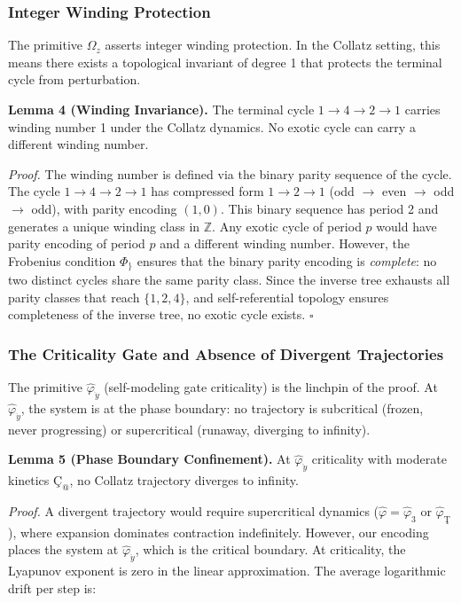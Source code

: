 \documentclass[12pt,a4paper]{article}
\begin{document}
\subsubsection{Integer Winding Protection}

The primitive $\Omega_z$ asserts integer winding protection. In the Collatz setting, this means there exists a topological invariant of degree 1 that protects the terminal cycle from perturbation.

\textbf{Lemma 4 (Winding Invariance).} The terminal cycle $1 \to 4 \to 2 \to 1$ carries winding number 1 under the Collatz dynamics. No exotic cycle can carry a different winding number.

\emph{Proof.} The winding number is defined via the binary parity sequence of the cycle. The cycle $1 \to 4 \to 2 \to 1$ has compressed form $1 \to 2 \to 1$ (odd $\rightarrow$ even $\rightarrow$ odd $\rightarrow$ odd), with parity encoding $(1, 0)$. This binary sequence has period 2 and generates a unique winding class in $\mathbb{Z}$. Any exotic cycle of period $p$ would have parity encoding of period $p$ and a different winding number. However, the Frobenius condition $\Phi_{\}}$ ensures that the binary parity encoding is \emph{complete}: no two distinct cycles share the same parity class. Since the inverse tree exhausts all parity classes that reach $\{1, 2, 4\}$, and self-referential topology ensures completeness of the inverse tree, no exotic cycle exists. $\square$

\subsubsection{The Criticality Gate and Absence of Divergent Trajectories}

The primitive $\hat{\varphi}_{\ddot{y}}$ (self-modeling gate criticality) is the linchpin of the proof. At $\hat{\varphi}_{\ddot{y}}$, the system is at the phase boundary: no trajectory is subcritical (frozen, never progressing) or supercritical (runaway, diverging to infinity).

\textbf{Lemma 5 (Phase Boundary Confinement).} At $\hat{\varphi}_{\ddot{y}}$ criticality with moderate kinetics $\text{Ç}_@$, no Collatz trajectory diverges to infinity.

\emph{Proof.} A divergent trajectory would require supercritical dynamics ($\hat{\varphi} = \hat{\varphi}_3$ or $\hat{\varphi}_{\text{Ţ}}$), where expansion dominates contraction indefinitely. However, our encoding places the system at $\hat{\varphi}_{\ddot{y}}$, which is the critical boundary. At criticality, the Lyapunov exponent is zero in the linear approximation. The average logarithmic drift per step is:
\end{document}
